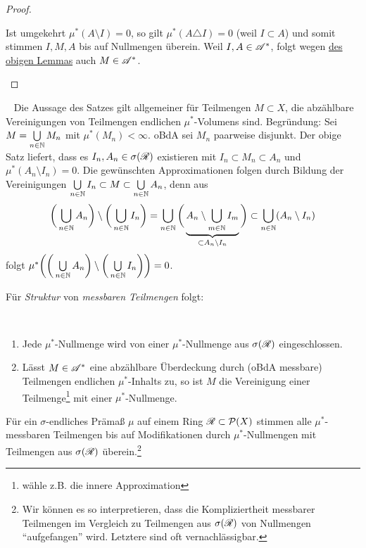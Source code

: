 \begin{satz}
\begin{proof}
\begin{itemize}
 Ist umgekehrt $\mu^*(A\setminus I)=0$, so gilt $\mu^*(A\triangle I)=0$ (weil $I \subset A$)  und somit stimmen $I,M,A$ bis auf Nullmengen überein. Weil $I,A \in \AA^*$, folgt wegen \hyperref[uebereinstimmen]{des obigen Lemmas} auch $M \in \AA^*$.
\end{itemize}
\end{proof}
\begin{remark}\
 Die Aussage des Satzes gilt allgemeiner für Teilmengen $M\subset X$, die abzählbare Vereinigungen von Teilmengen endlichen $\mu^*$-Volumens sind. Begründung: Sei $M=\bigcup\limits_{n\in\N}M_n$ mit $\mu^*(M_n)<\infty$. oBdA sei $M_n$ paarweise disjunkt. Der obige Satz liefert, dass es $I_n, A_n \in \sigma(\RR)$ existieren mit $I_n \subset M_n \subset A_n$ und $\mu^*(A_n \setminus I_n)=0$. Die gewünschten Approximationen folgen durch Bildung der Vereinigungen $\bigcup\limits_{n \in \N}I_n \subset M \subset \bigcup\limits_{n\in\N}A_n$, denn aus
$$\bigg( 
\bigcup\limits_{n\in\N} A_n
\bigg) \setminus \bigg(
\bigcup\limits_{n\in \N} I_n
\bigg) =
\bigcup_{n \in \N} \bigg(\underbrace{A_n \setminus \bigcup_{m\in\N}I_m}_{\subset A_n \setminus I_n} \bigg) \subset \bigcup_{n \in \N} (A_n \setminus I_n)$$
folgt $\mu^*\bigg( \bigg( \bigcup\limits_{n\in \N}A_n \bigg)\setminus \bigg( \bigcup\limits_{n \in \N} I_n \bigg)  \bigg)=0$.
\end{remark}
\end{satz}

Für \emph{Struktur} von \emph{messbaren Teilmengen} folgt:
\begin{korollar}\
\begin{mdframed}
\begin{enumerate}[label=(\roman*)]
\item Jede $\mu^*$-Nullmenge wird von einer $\mu^*$-Nullmenge aus $\sigma(\RR)$ eingeschlossen.
\item Lässt $M \in \AA^*$ eine abzählbare Überdeckung durch (oBdA messbare) Teilmengen endlichen $\mu^*$-Inhalts zu, so ist $M$ die Vereinigung einer Teilmenge\footnote{wähle z.B. die innere Approximation} mit einer $\mu^*$-Nullmenge.
\end{enumerate}
\end{mdframed}
\end{korollar}

\begin{korollar}
\begin{mdframed}
Für ein $\sigma$-endliches Prämaß $\mu$ auf einem Ring $\RR \subset \PP(X)$ stimmen alle $\mu^*$-messbaren Teilmengen bis auf Modifikationen durch $\mu^*$-Nullmengen mit Teilmengen aus $\sigma(\RR)$ überein.\footnote{Wir können es so interpretieren, dass die Kompliziertheit messbarer Teilmengen im Vergleich zu Teilmengen aus $\sigma(\RR)$ von Nullmengen ``aufgefangen'' wird. Letztere sind oft vernachlässigbar.}
\end{mdframed}
\end{korollar}

